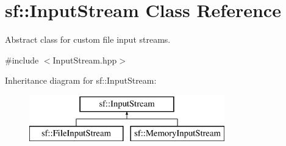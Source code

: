 \hypertarget{classsf_1_1_input_stream}{}\section{sf\+:\+:Input\+Stream Class Reference}
\label{classsf_1_1_input_stream}


Abstract class for custom file input streams.  




{\ttfamily \#include $<$Input\+Stream.\+hpp$>$}

Inheritance diagram for sf\+:\+:Input\+Stream\+:\begin{figure}[H]
\begin{center}
\leavevmode
\includegraphics[height=2.000000cm]{classsf_1_1_input_stream}
\end{center}
\end{figure}
